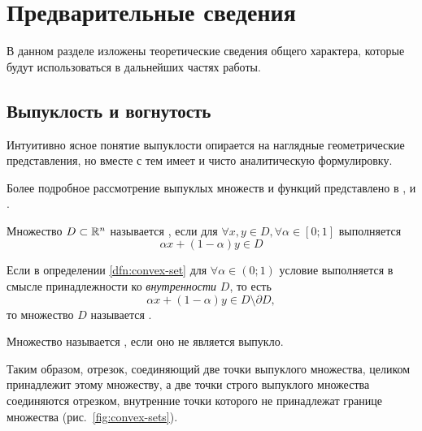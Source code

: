 \section{Предварительные сведения}
В данном разделе изложены теоретические сведения общего характера,
которые будут использоваться в дальнейших частях работы.

\subsection{Выпуклость и вогнутость}
\label{sec:convexity}
Интуитивно ясное понятие выпуклости опирается на наглядные
геометрические представления, но вместе с тем имеет и чисто
аналитическую формулировку.

Более подробное рассмотрение выпуклых множеств и функций представлено
в \cite{polovinkin04}, \cite{kolmogorov72} и \cite{fikhtengolz03}.

\begin{dfn}
  \label{dfn:convex-set}
  Множество $D \subset \mathbb{R}^n$ называется , если
  для $\forall x, y \in D, \forall \alpha \in [0;1]$ выполняется
  \begin{equation*}
    \alpha x + (1-\alpha) y \in D
  \end{equation*}
\end{dfn}
\begin{dfn}
  Если в определении \ref{dfn:convex-set} для $\forall \alpha \in
  (0;1)$ условие выполняется в смысле принадлежности ко
  \emph{внутренности} $D$, то есть
  \begin{equation*}
    \alpha x + (1-\alpha) y \in D \setminus \partial D,
  \end{equation*}
  то множество $D$ называется .
\end{dfn}
\begin{dfn}
  Множество называется , если оно не является
  выпукло.
\end{dfn}
Таким образом, отрезок, соединяющий две точки выпуклого множества,
целиком принадлежит этому множеству, а две точки строго выпуклого
множества соединяются отрезком, внутренние точки которого не
принадлежат границе множества (рис. \ref{fig:convex-sets}).



